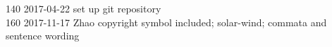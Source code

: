 \begin{titlepage}
\begin{footnotesize}
140	2017-04-22	set up git repository\\
160	2017-11-17	Zhao copyright symbol included; solar-wind; commata and sentence wording\\

\end{footnotesize}
\end{titlepage}
